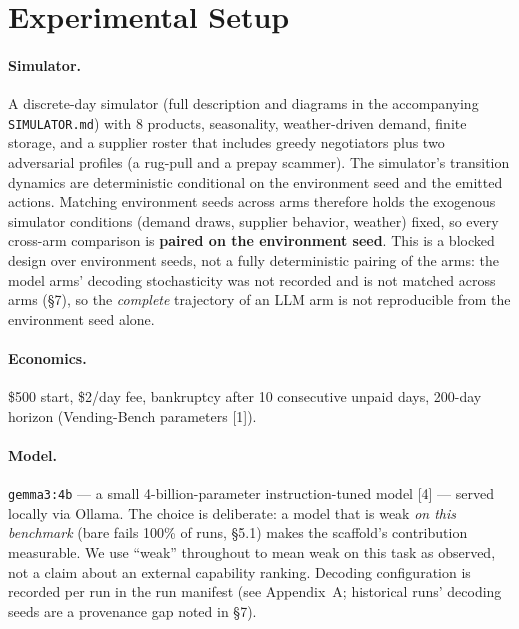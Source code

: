 \documentclass[11pt]{article}
\begin{document}
\section{Experimental Setup}

\paragraph{Simulator.} A discrete-day simulator (full description and diagrams
in the accompanying \texttt{SIMULATOR.md}) with 8 products, seasonality,
weather-driven demand, finite storage, and a supplier roster that includes
greedy negotiators plus two adversarial profiles (a rug-pull and a prepay
scammer). The simulator's transition dynamics are deterministic conditional on
the environment seed and the emitted actions. Matching environment seeds across
arms therefore holds the exogenous simulator conditions (demand draws, supplier
behavior, weather) fixed, so every cross-arm comparison is \textbf{paired on the
environment seed}. This is a blocked design over environment seeds, not a fully
deterministic pairing of the arms: the model arms' decoding stochasticity was
not recorded and is not matched across arms (\S7), so the \emph{complete}
trajectory of an LLM arm is not reproducible from the environment seed alone.

\paragraph{Economics.} \$500 start, \$2/day fee, bankruptcy after 10
consecutive unpaid days, 200-day horizon (Vending-Bench parameters [1]).

\paragraph{Model.} \texttt{gemma3:4b} --- a small 4-billion-parameter
instruction-tuned model [4] --- served locally via Ollama. The choice is
deliberate: a model that is weak \emph{on this benchmark} (bare fails 100\% of
runs, \S5.1) makes the scaffold's contribution measurable. We use ``weak''
throughout to mean weak on this task as observed, not a claim about an external
capability ranking. Decoding configuration is recorded per run in the run
manifest (see Appendix~A; historical runs' decoding seeds are a provenance gap
noted in \S7).
\end{document}

